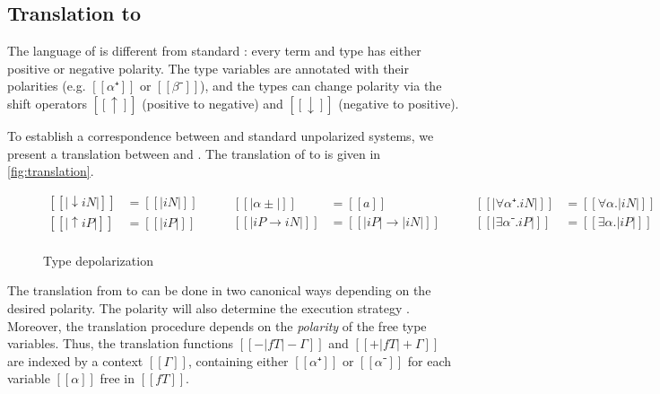 \subsection{Translation to \fexists}

The language of \fexists is different from standard \systemf:
every term and type has either positive or negative polarity.
The type variables are annotated with their polarities
(e.g. $[[α⁺]]$ or $[[β⁻]]$), and the types can change polarity
via the shift operators $[[↑]]$ (positive to negative) and
$[[↓]]$ (negative to positive).

To establish a correspondence between \fexists and standard unpolarized systems,
we present a translation between \fexists and \systemf. The translation of
\systemf to \fexists is given in \cref{fig:translation}.

\begin{figure}
  \begin{equation*}
  \begin{aligned}
    [[|↓iN|]] &= [[|iN|]] \\
    [[|↑iP|]] &= [[|iP|]] \\
  \end{aligned}
  \qquad
  \begin{aligned}
    [[|α±|]] &= [[a]] \\
    [[|iP → iN|]] &= [[|iP| → |iN|]] \\
  \end{aligned}
  \qquad
  \begin{aligned}
    [[|∀α⁺.iN|]] &= [[∀α.|iN|]] \\
    [[|∃α⁻.iP|]] &= [[∃α.|iP|]] \\
  \end{aligned}
  \end{equation*}
  \caption{Type depolarization}
  \label{fig:depolarization}
\end{figure}

The translation from \systemf to \fexists can be done in two canonical ways
depending on the desired polarity. The polarity will also determine the 
execution strategy .
Moreover, the translation procedure depends on the \emph{polarity} of the
free type variables. Thus, the translation functions 
$[[-| fT |-Γ]]$ and $[[+| fT |+Γ]]$ are indexed by a context $[[Γ]]$, 
containing either $[[α⁺]]$ or $[[α⁻]]$ for each variable $[[α]]$ free in $[[fT]]$.

